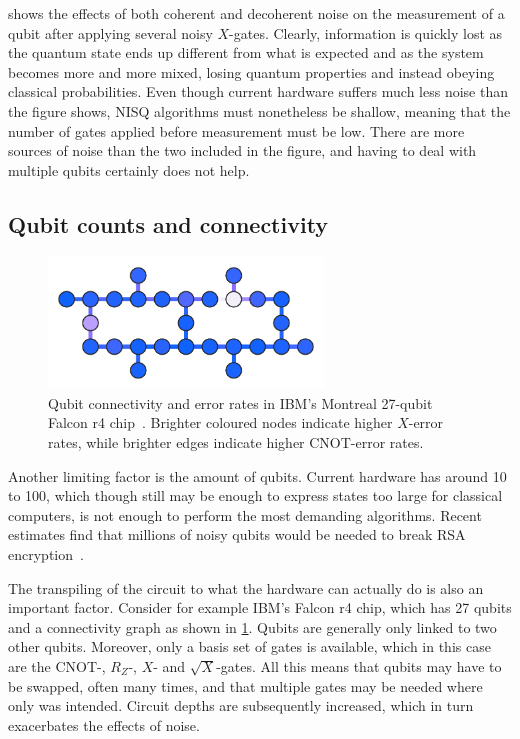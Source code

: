  shows the effects of both coherent and decoherent noise on the measurement of a qubit after applying several noisy $X$-gates.
Clearly, information is quickly lost as the quantum state ends up different from what is expected and as the system becomes more and more mixed, losing quantum properties and instead obeying classical probabilities.
Even though current hardware suffers much less noise than the figure shows, NISQ algorithms must nonetheless be shallow, meaning that the number of gates applied before measurement must be low.
There are more sources of noise than the two included in the figure, and having to deal with multiple qubits certainly does not help.

\subsection{Qubit counts and connectivity}
\label{sec:qubit_counts}
\begin{figure}
    \centering
    \includegraphics[width=0.65\textwidth]{connectivity.pdf}
    \caption[
        Qubit connectivity and error rates example.
    ]{
        Qubit connectivity and error rates in IBM's Montreal 27-qubit Falcon r4 chip~\autocite{connectivity}.
        Brighter coloured nodes indicate higher $X$-error rates, while brighter edges indicate higher CNOT-error rates.
    }
    \label{fig:connectivity}
\end{figure}

Another limiting factor is the amount of qubits.
Current hardware has around 10 to 100, which though still may be enough to express states too large for classical computers, is not enough to perform the most demanding algorithms.
Recent estimates find that millions of noisy qubits would be needed to break RSA encryption~\autocite{gidney2021}.

The transpiling of the circuit to what the hardware can actually do is also an important factor.
Consider for example IBM's Falcon r4 chip, which has 27 qubits and a connectivity graph as shown in \cref{fig:connectivity}.
Qubits are generally only linked to two other qubits.
Moreover, only a basis set of gates is available, which in this case are the CNOT-, $R_Z$-, $X$- and $\sqrt{X}$-gates.
All this means that qubits may have to be swapped, often many times, and that multiple gates may be needed where only was intended.
Circuit depths are subsequently increased, which in turn exacerbates the effects of noise.